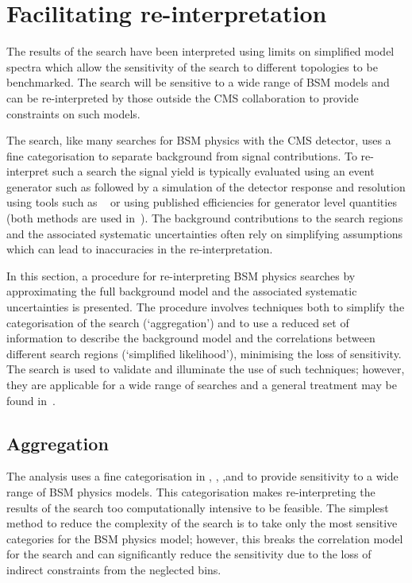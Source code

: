 \chapter{Facilitating re-interpretation} %
\label{cha:simplifiedLikelihood}
The results of the \alphat search have been interpreted using limits on simplified model
spectra which allow the sensitivity of the search to different topologies 
to be benchmarked. The search will be sensitive to a wide range of BSM models
and can be re-interpreted by those outside the 
CMS collaboration to provide constraints on such models.

The \alphat search, like many searches for BSM physics with the CMS detector, uses a 
fine categorisation to separate background from signal contributions. To re-interpret
such a search the signal yield is typically evaluated using an event generator such as \PYTHIA 
followed by a simulation of the detector response and resolution using tools 
such as \DELPHES~\cite{delphes} or using published efficiencies for generator
level quantities (both methods are used in~\cite{Drees:2013wra,Fastlim,mastercode}).
The background contributions to the search regions and the associated systematic uncertainties often rely
on simplifying assumptions which can lead to inaccuracies in the re-interpretation. 

In this section, a procedure for re-interpreting BSM physics searches by approximating
the full background model and the associated systematic uncertainties is presented. 
The procedure involves techniques both to simplify the categorisation of the search (`aggregation')
and to use a reduced set of information to describe the background model 
and the correlations between different search regions (`simplified likelihood'),
minimising the loss of sensitivity. The \alphat search is used to validate and illuminate
the use of such techniques; however, they are applicable for a wide range of 
searches and a general treatment may be found in~\cite{simp-lik}.

\section{Aggregation}%
\label{sec:agg-reg}
The \alphat analysis uses a fine categorisation in \njet, \nb, \scalht,and \mht to provide
sensitivity to a wide range of BSM physics models. This categorisation makes re-interpreting
the results of the search too computationally intensive to be feasible. The simplest method to
reduce the complexity of the search is to take only the most sensitive categories for 
the BSM physics model; however, this breaks the correlation model for the search and can significantly reduce
the sensitivity due to the loss of indirect constraints from
the neglected bins. 

